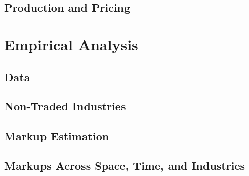 
\subsection{Production and Pricing}\label{sec:production}




\section{Empirical Analysis}\label{sec:empanal}

\subsection{Data}\label{sec:data}


\subsection{Non-Traded Industries}\label{sec:industries}


\subsection{Markup Estimation}\label{sec:muest}


\subsection{Markups Across Space, Time, and Industries}\label{sec:muresults}




